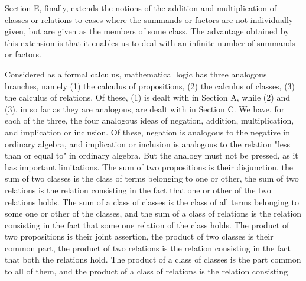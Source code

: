 \documentclass[10pt]{article}
\begin{document}
Section E, finally, extends the notions of the addition and multiplication of classes or relations to cases where the summands or factors are not individually given, but are given as the members of some class. The advantage obtained by this extension is that it enables us to deal with an infinite number of summands or factors.

Considered as a formal calculus, mathematical logic has three analogous branches, namely (1) the calculus of propositions, (2) the calculus of classes, (3) the calculus of relations. Of these, (1) is dealt with in Section A, while (2) and (3), in so far as they are analogous, are dealt with in Section C. We have, for each of the three, the four analogous ideas of negation, addition, multiplication, and implication or inclusion. Of these, negation is analogous to the negative in ordinary algebra, and implication or inclusion is analogous to the relation "less than or equal to" in ordinary algebra. But the analogy must not be pressed, as it has important limitations. The sum of two propositions is their disjunction, the sum of two classes is the class of terms belonging to one or other, the sum of two relations is the relation consisting in the fact that one or other of the two relations holds. The sum of a class of classes is the class of all terms belonging to some one or other of the classes, and the sum of a class of relations is the relation consisting in the fact that some one relation of the class holds. The product of two propositions is their joint assertion, the product of two classes is their common part, the product of two relations is the relation consisting in the fact that both the relations hold. The product of a class of classes is the part common to all of them, and the product of a class of relations is the relation consisting\\
\end{document}
